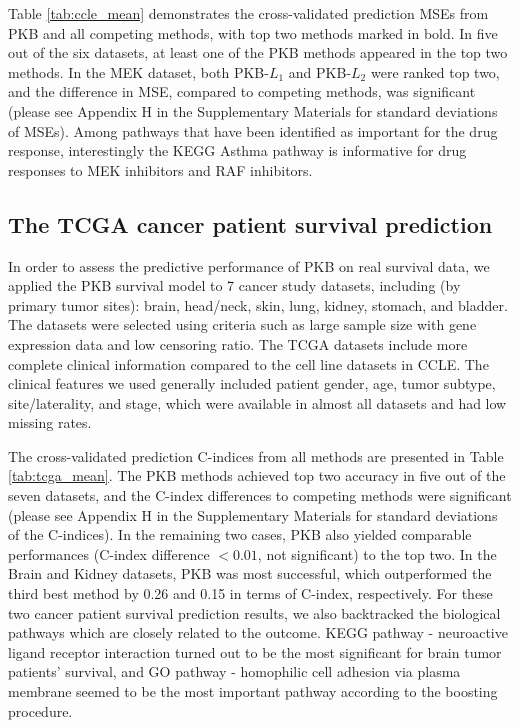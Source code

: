 \documentclass[a4paper,12pt]{article}
\begin{document}
Table \ref{tab:ccle_mean} demonstrates the cross-validated prediction MSEs from PKB and all competing methods, with top two methods marked in bold. In five out of the six datasets, at least one of the PKB methods appeared in the top two methods. In the MEK dataset, both PKB-$L_1$ and PKB-$L_2$ were ranked top two, and the difference in MSE, compared to competing methods, was significant (please see Appendix H in the Supplementary Materials for standard deviations of MSEs). Among pathways that have been identified as important for the drug response, interestingly the KEGG Asthma pathway is informative for drug responses to MEK inhibitors and RAF inhibitors.  


\subsection{The TCGA cancer patient survival prediction}

In order to assess the predictive performance of PKB on real survival data, we applied the PKB survival model to 7 cancer study datasets, including (by primary tumor sites): brain, head/neck, skin, lung, kidney, stomach, and bladder. The datasets were selected using criteria such as large sample size with gene expression data and low censoring ratio. The TCGA datasets include more complete clinical information compared to the cell line datasets in CCLE. The clinical features we used generally included patient gender, age, tumor subtype, site/laterality, and stage, which were available in almost all datasets and had low missing rates. 

The cross-validated prediction C-indices from all methods are presented in Table \ref{tab:tcga_mean}. The PKB methods achieved top two accuracy in five out of the seven datasets, and the C-index differences to competing methods were significant (please see Appendix H in the Supplementary Materials for standard deviations of the C-indices). In the remaining two cases, PKB also yielded comparable performances (C-index difference $< 0.01$, not significant) to the top two. In the Brain and Kidney datasets, PKB was most successful, which outperformed the third best method by 0.26 and 0.15 in terms of C-index, respectively. For these two cancer patient survival prediction results, we also backtracked the biological pathways which are closely related to the outcome. KEGG pathway - neuroactive ligand receptor interaction turned out to be the most significant for brain tumor patients' survival, and GO pathway - homophilic cell adhesion via plasma membrane seemed to be the most important pathway according to the boosting procedure. 
\end{document}
